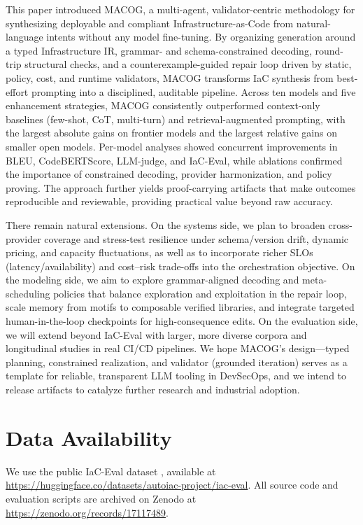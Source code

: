 \documentclass[manuscript,screen,nonacm]{acmart}
\begin{document}
This paper introduced MACOG, a multi-agent, validator-centric methodology for synthesizing deployable and compliant Infrastructure-as-Code from natural-language intents without any model fine-tuning. By organizing generation around a typed Infrastructure IR, grammar- and schema-constrained decoding, round-trip structural checks, and a counterexample-guided repair loop driven by static, policy, cost, and runtime validators, MACOG transforms IaC synthesis from best-effort prompting into a disciplined, auditable pipeline. Across ten models and five enhancement strategies, MACOG consistently outperformed context-only baselines (few-shot, CoT, multi-turn) and retrieval-augmented prompting, with the largest absolute gains on frontier models and the largest relative gains on smaller open models. Per-model analyses showed concurrent improvements in BLEU, CodeBERTScore, LLM-judge, and IaC-Eval, while ablations confirmed the importance of constrained decoding, provider harmonization, and policy proving. The approach further yields proof-carrying artifacts that make outcomes reproducible and reviewable, providing practical value beyond raw accuracy.

There remain natural extensions. On the systems side, we plan to broaden cross-provider coverage and stress-test resilience under schema/version drift, dynamic pricing, and capacity fluctuations, as well as to incorporate richer SLOs (latency/availability) and cost–risk trade-offs into the orchestration objective. On the modeling side, we aim to explore grammar-aligned decoding and meta-scheduling policies that balance exploration and exploitation in the repair loop, scale memory from motifs to composable verified libraries, and integrate targeted human-in-the-loop checkpoints for high-consequence edits. On the evaluation side, we will extend beyond IaC-Eval with larger, more diverse corpora and longitudinal studies in real CI/CD pipelines. We hope MACOG’s design—typed planning, constrained realization, and validator (grounded iteration) serves as a template for reliable, transparent LLM tooling in DevSecOps, and we intend to release artifacts to catalyze further research and industrial adoption.

\section{Data Availability}
We use the public IaC-Eval dataset \cite{kon2024iac}, available at \url{https://huggingface.co/datasets/autoiac-project/iac-eval}.
All source code and evaluation scripts are archived on Zenodo at \url{https://zenodo.org/records/17117489}.
\end{document}
